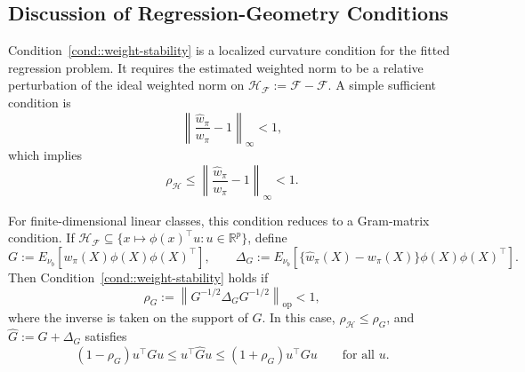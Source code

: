 \documentclass{article}
\theoremstyle{plain}
\theoremstyle{definition}
\theoremstyle{remark}
\begin{document}
\subsection{Discussion of Regression-Geometry Conditions}
\label{app:conditions}

Condition~\ref{cond::weight-stability} is a localized curvature condition for
the fitted regression problem. It requires the estimated weighted norm to be a
relative perturbation of the ideal weighted norm on
\(\mathcal H_{\mathcal F}:=\mathcal F-\mathcal F\). A simple sufficient
condition is
\[
\left\|\frac{\widehat w_\pi}{w_\pi}-1\right\|_\infty<1,
\]
which implies
\[
\rho_{\mathcal H}
\le
\left\|\frac{\widehat w_\pi}{w_\pi}-1\right\|_\infty < 1 .
\]

For finite-dimensional linear classes, this condition reduces to a Gram-matrix
condition. If
\(\mathcal H_{\mathcal F}\subseteq\{x\mapsto \phi(x)^\top u:u\in\mathbb R^p\}\),
define
\[
G
:=
E_{\nu_b}\!\left[w_\pi(X)\phi(X)\phi(X)^\top\right],
\qquad
\Delta_G
:=
E_{\nu_b}\!\left[
\{\widehat w_\pi(X)-w_\pi(X)\}\phi(X)\phi(X)^\top
\right].
\]
Then Condition~\ref{cond::weight-stability} holds if
\[
\rho_G
:=
\left\|
G^{-1/2}\Delta_GG^{-1/2}
\right\|_{\mathrm{op}}
<1,
\]
where the inverse is taken on the support of \(G\). In this case,
\(\rho_{\mathcal H}\le \rho_G\), and
\(\widehat G:=G+\Delta_G\) satisfies
\[
(1-\rho_G)u^\top Gu
\le
u^\top \widehat G u
\le
(1+\rho_G)u^\top Gu
\qquad\text{for all }u .
\]
\end{document}
